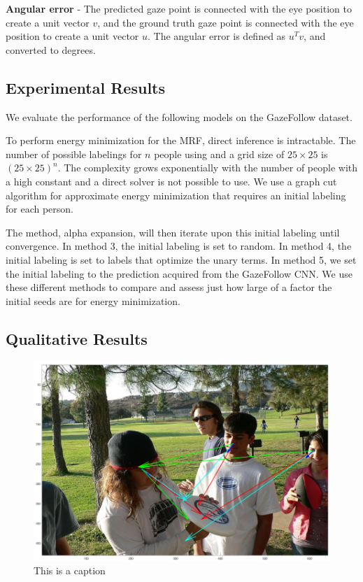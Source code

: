 \documentclass[10pt,twocolumn,letterpaper]{article}
\begin{document}
\textbf{Angular error} - The predicted gaze point is connected with the eye position to create a unit vector $v$, and the ground truth gaze point is connected with the eye position to create a unit vector $u$. The angular error is defined as $u^T v$, and converted to degrees.

\subsection{Experimental Results}

We evaluate the performance of the following models on the GazeFollow \cite{nips15_recasens} dataset.

To perform energy minimization for the MRF, direct inference is intractable. The number of possible labelings for $n$ people using and a grid size of $25 \times 25$ is $ (25 \times 25)^n$. The complexity grows exponentially with the number of people with a high constant and a direct solver is not possible to use. We use a graph cut algorithm \cite{boykov2001fast} for approximate energy minimization that requires an initial labeling for each person.

The method, alpha expansion, will then iterate upon this initial labeling until convergence. In method 3, the initial labeling is set to random. In method 4, the initial labeling is set to labels that optimize the unary terms. In method 5, we set the initial labeling to the prediction acquired from the GazeFollow CNN. We use these different methods to compare and assess just how large of a factor the initial seeds are for energy minimization.

\subsection{Qualitative Results}

\begin{figure}[t]
  \begin{center}
    \includegraphics[width=0.95\linewidth]{images/fail1.png}
  \end{center}
  \vspace{-0.3cm}
   \caption{This is a caption}
  \vspace{-0.5cm}
\end{figure}

{\small


}
\end{document}
